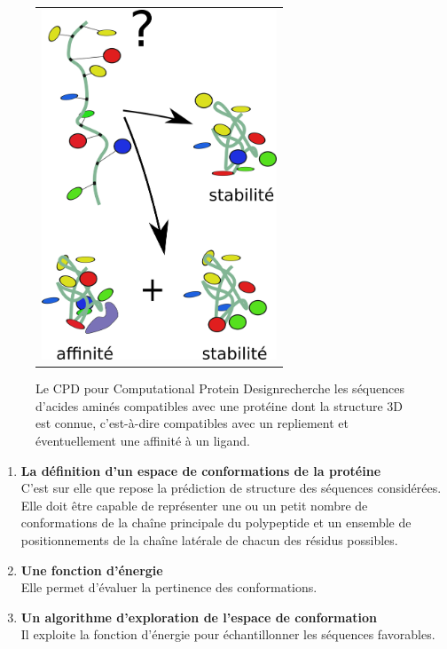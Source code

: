    \begin{figure}[!htbp]
     \centering
     \begin{tabular}{c}
       \includegraphics[width=7cm]{figure/CPD.png} &
     \end{tabular}
     
     \caption{Le CPD pour \og Computational Protein Design\fg recherche les séquences d'acides aminés compatibles avec une protéine dont la structure 3D  est connue, c'est-à-dire compatibles avec un repliement et éventuellement une affinité à un ligand.}
\label{graph:CPD}
   \end{figure}


\begin{enumerate}[leftmargin=*]

\item \textbf{La définition d'un espace de conformations de la protéine}\\
C'est sur elle que repose la prédiction de structure des séquences considérées. Elle doit être capable de représenter une ou un petit nombre de conformations de la chaîne principale du polypeptide et un ensemble de positionnements de la chaîne latérale de chacun des résidus possibles.
\item \textbf{Une fonction d'énergie}\\
Elle permet d'évaluer la pertinence des conformations. 
\item \textbf{Un algorithme d'exploration de l'espace de conformation}\\
Il exploite la fonction d'énergie pour échantillonner les séquences favorables.
\end{enumerate}

